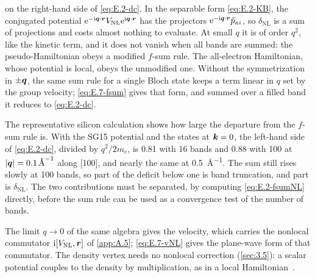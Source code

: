 on the right-hand side of \cref{eq:E.2-dc}. In the separable form \cref{eq:E.2-KB}, the conjugated potential $\mathrm{e}^{-\mathrm{i}\bm{q}\cdot\bm{r}}V_{\mathrm{NL}}\mathrm{e}^{\mathrm{i}\bm{q}\cdot\bm{r}}$ has the projectors $\mathrm{e}^{-\mathrm{i}\bm{q}\cdot\bm{r}}\tilde p_{\kappa i}$, so $\delta_{\mathrm{NL}}$ is a sum of projections and costs almost nothing to evaluate. At small $q$ it is of order $q^2$, like the kinetic term, and it does not vanish when all bands are summed: the pseudo-Hamiltonian obeys a modified $f$-sum rule. The all-electron Hamiltonian, whose potential is local, obeys the unmodified one. Without the symmetrization in $\pm\bm{q}$, the same sum rule for a single Bloch state keeps a term linear in $q$ set by the group velocity; \cref{eq:E.7-fsum} gives that form, and summed over a filled band it reduces to \cref{eq:E.2-dc}.

The representative silicon calculation shows how large the departure from the $f$-sum rule is. With the SG15 potential and the states at $\bm{k} = 0$, the left-hand side of \cref{eq:E.2-dc}, divided by $q^2/2m_e$, is 0.81 with 16 bands and 0.88 with 100 at $|\bm{q}| = \SI{0.1}{\angstrom^{-1}}$ along [100], and nearly the same at \SI{0.5}{\angstrom^{-1}}. The sum still rises slowly at 100 bands, so part of the deficit below one is band truncation, and part is $\delta_{\mathrm{NL}}$. The two contributions must be separated, by computing \cref{eq:E.2-fsumNL} directly, before the sum rule can be used as a convergence test of the number of bands.

The limit $q \to 0$ of the same algebra gives the velocity, which carries the nonlocal commutator $\mathrm{i}[V_{\mathrm{NL}}, \bm{r}]$ of \cref{app:A.5}; \cref{eq:E.7-vNL} gives the plane-wave form of that commutator. The density vertex needs no nonlocal correction (\cref{sec:3.5}): a scalar potential couples to the density by multiplication, as in a local Hamiltonian~\cite[Eq.~(5)]{ismailbeigi2001coupling}.
